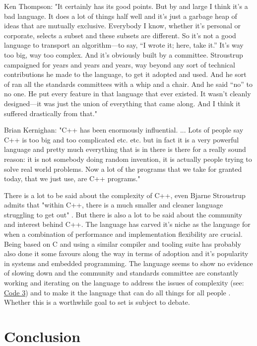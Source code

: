 \documentclass[conference, a4paper]{IEEEtran}
\begin{document}
Ken Thompson:
"It certainly has its good points. But by and large I think it’s a bad language. It does a lot of things half well and it’s just a garbage heap of ideas that are mutually exclusive. Everybody I know, whether it’s personal or corporate, selects a subset and these subsets are different. So it’s not a good language to transport an algorithm—to say, “I wrote it; here, take it.” It’s way too big, way too complex. And it’s obviously built by a committee. Stroustrup campaigned for years and years and years, way beyond any sort of technical contributions he made to the language, to get it adopted and used. And he sort of ran all the standards committees with a whip and a chair. And he said “no” to no one. He put every feature in that language that ever existed. It wasn’t cleanly designed—it was just the union of everything that came along. And I think it suffered drastically from that." \cite{Seibel_2009}

Brian Kernighan:
"C++ has been enormously influential. ... Lots of people say C++ is too big and too complicated etc. etc. but in fact it is a very powerful language and pretty much everything that is in there is there for a really sound reason: it is not somebody doing random invention, it is actually people trying to solve real world problems. Now a lot of the programs that we take for granted today, that we just use, are C++ programs." \cite{bkcomputerphile}

There is a lot to be said about the complexity of C++, even Bjarne Stroustrup admits that "within C++, there is a much smaller and cleaner language struggling to get out" \cite{cppquotes}. But there is also a lot to be said about the community and interest behind C++. The language has carved it's niche as the language for when a combination of performance and implementation flexibility are crucial. Being based on C and using a similar compiler and tooling suite has probably also done it some favours along the way in terms of adoption and it's popularity in systems and embedded programming. The language seems to show no evidence of slowing down and the community and standards committee are constantly working and iterating on the language to address the issues of complexity (see: \hyperref[listing:3]{Code 3}) and to make it the language that can do all things for all people . Whether this is a worthwhile goal to set is subject to debate. 

\section{Conclusion}
\end{document}

